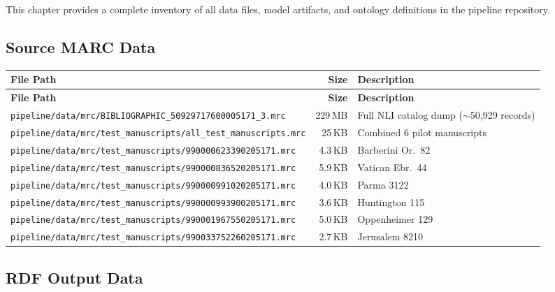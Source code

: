 \documentclass[12pt]{article}
\newcommand{\filepath}[1]{\texttt{\small #1}}
\begin{document}
This chapter provides a complete inventory of all data files, model artifacts, and ontology definitions in the pipeline repository.

\subsection{Source MARC Data}

\begin{longtable}{|p{9cm}|r|p{3cm}|}
\hline
\textbf{File Path} & \textbf{Size} & \textbf{Description} \\
\hline
\endfirsthead
\hline
\textbf{File Path} & \textbf{Size} & \textbf{Description} \\
\hline
\endhead
\hline
\endfoot
\filepath{pipeline/data/mrc/BIBLIOGRAPHIC\_50929717600005171\_3.mrc} & 229\,MB & Full NLI catalog dump ($\sim$50,929 records) \\
\hline
\filepath{pipeline/data/mrc/test\_manuscripts/all\_test\_manuscripts.mrc} & 25\,KB & Combined 6 pilot manuscripts \\
\hline
\filepath{pipeline/data/mrc/test\_manuscripts/990000623390205171.mrc} & 4.3\,KB & Barberini Or.\ 82 \\
\hline
\filepath{pipeline/data/mrc/test\_manuscripts/990000836520205171.mrc} & 5.9\,KB & Vatican Ebr.\ 44 \\
\hline
\filepath{pipeline/data/mrc/test\_manuscripts/990000991020205171.mrc} & 4.0\,KB & Parma 3122 \\
\hline
\filepath{pipeline/data/mrc/test\_manuscripts/990000993900205171.mrc} & 3.6\,KB & Huntington 115 \\
\hline
\filepath{pipeline/data/mrc/test\_manuscripts/990001967550205171.mrc} & 5.0\,KB & Oppenheimer 129 \\
\hline
\filepath{pipeline/data/mrc/test\_manuscripts/990033752260205171.mrc} & 2.7\,KB & Jerusalem 8210 \\
\hline
\end{longtable}

\subsection{RDF Output Data}
\end{document}

